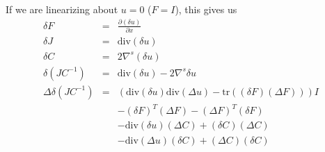 \documentclass{article}
\begin{document}
If we are linearizing about $u = 0$ ($F = I$), this gives us
\begin{eqnarray*}
\delta F & = & \frac{\partial (\delta u)}{\partial x} \\
\delta J & = & \mathrm{div}(\delta u) \\
\delta C & = & 2 \nabla^s (\delta u) \\
\delta (JC^{-1}) 
& = & \mathrm{div}(\delta u) - 2 \nabla^s \delta u \\
\Delta \delta (JC^{-1})
& = & \left( \mathrm{div}(\delta u) \mathrm{div}(\Delta u) -
\mathrm{tr}\left( (\delta F) (\Delta F) \right) \right) I \\
&   & - (\delta F)^T (\Delta F) - (\Delta F)^T (\delta F) \\
&   & - \mathrm{div}(\delta u) (\Delta C) + (\delta C) (\Delta C) \\
&   & - \mathrm{div}(\Delta u) (\delta C) + (\Delta C) (\delta C)
\end{eqnarray*}
\end{document}
